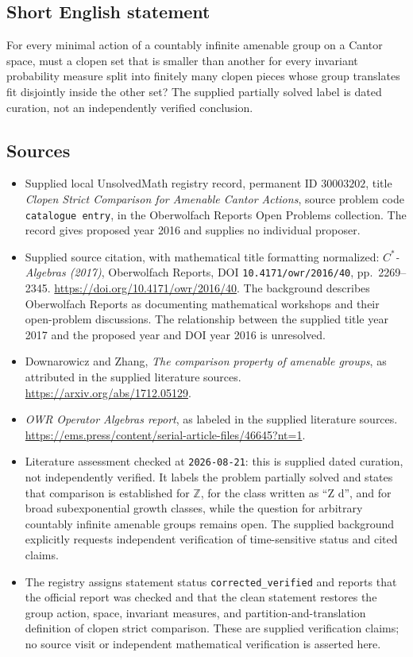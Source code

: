 \documentclass[11pt]{article}
\newcommand{\Z}{\mathbb{Z}}
\begin{document}
\subsection{Short English statement}
For every minimal action of a countably infinite amenable group on a Cantor space, must a clopen set that is smaller than another for every invariant probability measure split into finitely many clopen pieces whose group translates fit disjointly inside the other set? The supplied partially solved label is dated curation, not an independently verified conclusion.
\subsection{Sources}
\begin{itemize}
\item Supplied local UnsolvedMath registry record, permanent ID \(30003202\), title \emph{Clopen Strict Comparison for Amenable Cantor Actions}, source problem code \texttt{catalogue entry}, in the Oberwolfach Reports Open Problems collection. The record gives proposed year 2016 and supplies no individual proposer.
\item Supplied source citation, with mathematical title formatting normalized: \emph{\(C^*\)-Algebras (2017)}, Oberwolfach Reports, DOI \texttt{10.4171/owr/2016/40}, pp.\ 2269--2345. \url{https://doi.org/10.4171/owr/2016/40}. The background describes Oberwolfach Reports as documenting mathematical workshops and their open-problem discussions. The relationship between the supplied title year 2017 and the proposed year and DOI year 2016 is unresolved.
\item Downarowicz and Zhang, \emph{The comparison property of amenable groups}, as attributed in the supplied literature sources. \url{https://arxiv.org/abs/1712.05129}.
\item \emph{OWR Operator Algebras report}, as labeled in the supplied literature sources. \url{https://ems.press/content/serial-article-files/46645?nt=1}.
\item Literature assessment checked at \texttt{2026-08-21}: this is supplied dated curation, not independently verified. It labels the problem partially solved and states that comparison is established for \(\Z\), for the class written as ``Z d'', and for broad subexponential growth classes, while the question for arbitrary countably infinite amenable groups remains open. The supplied background explicitly requests independent verification of time-sensitive status and cited claims.
\item The registry assigns statement status \texttt{corrected\_verified} and reports that the official report was checked and that the clean statement restores the group action, space, invariant measures, and partition-and-translation definition of clopen strict comparison. These are supplied verification claims; no source visit or independent mathematical verification is asserted here.
\end{itemize}
\end{document}
